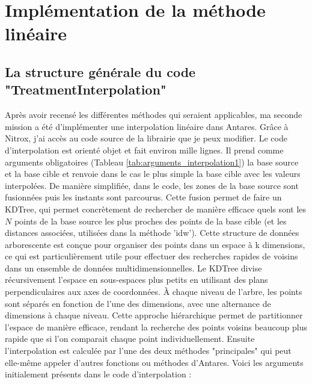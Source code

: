 \section{Implémentation de la méthode linéaire}

\subsection{La structure générale du code "TreatmentInterpolation"}

Après avoir recensé les différentes méthodes qui seraient applicables, ma seconde mission a été d'implémenter une interpolation linéaire dans Antares. Grâce à Nitrox, j'ai accès au code source de la librairie que je peux modifier. Le code d'interpolation est orienté objet et fait environ mille lignes. 
Il prend comme arguments obligatoires (Tableau \ref{tab:arguments_interpolation1}) la base source et la base cible et renvoie dans le cas le plus simple la base cible avec les valeurs interpolées.
De manière simplifiée, dans le code, les zones de la base source sont fusionnées puis les instants sont parcourus. 
Cette fusion permet de faire un \ac{KDTree}, qui permet concrètement de rechercher de manière efficace quels sont les \( N \) points de la base source les plus proches des points de la base cible (et les distances associées, utilisées dans la méthode 'idw').
Cette structure de données arborescente est conçue pour organiser des points dans un espace à k dimensions, ce qui est particulièrement utile pour effectuer des recherches rapides de voisins dans un ensemble de données multidimensionnelles.
Le KDTree divise récursivement l'espace en sous-espaces plus petits en utilisant des plans perpendiculaires aux axes de coordonnées. À chaque niveau de l'arbre, les points sont séparés en fonction de l'une des dimensions, avec une alternance de dimensions à chaque niveau. Cette approche hiérarchique permet de partitionner l'espace de manière efficace, rendant la recherche des points voisins beaucoup plus rapide que si l'on comparait chaque point individuellement.
Ensuite l'interpolation est calculée par l'une des deux méthodes "principales" qui peut elle-même appeler d'autres fonctions ou méthodes d'Antares.
Voici les arguments initialement présents dans le code d'interpolation :


